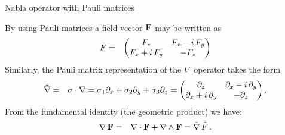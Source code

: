 \documentclass[10pt]{beamer}
\begin{document}
\begin{frame}[fragile]{Nabla operator with Pauli matrices}

By using Pauli matrices a field vector $\mathbf{F}$ may be written as
%
\begin{eqnarray}
 \tilde{F}  & = &  \begin{pmatrix}{F}_{z} & {F}_{x}-i\,{F}_{y}\cr {F}_{x}+i\,{F}_{y} & -{F}_{z}\end{pmatrix}  
\end{eqnarray}
%
Similarly, \alert{the Pauli matrix representation of the $\nabla$ operator} takes the form
%
\begin{eqnarray}
\tilde{\nabla}  & = &  \sigma \cdot \nabla = \sigma_1 \partial_x + \sigma_2 \partial_y +\sigma_3 \partial_z =
 \begin{pmatrix}{\partial}_{z} & {\partial}_{x}-i\,{\partial}_{y}\cr {\partial}_{x}+i\,{\partial}_{y} & -{\partial}_{z}\end{pmatrix} .
\end{eqnarray}
%
From the fundamental identity (the geometric product) we have:
%
\begin{eqnarray}
 \nabla \, {\bf F}  & = &   \nabla \cdot \mathbf{F} + \nabla \wedge \mathbf{F} =  \tilde{\nabla} \,  \tilde{F}  \, .
 \label{Pauli_Identity}
\end{eqnarray}
%


\end{frame}
\end{document}
